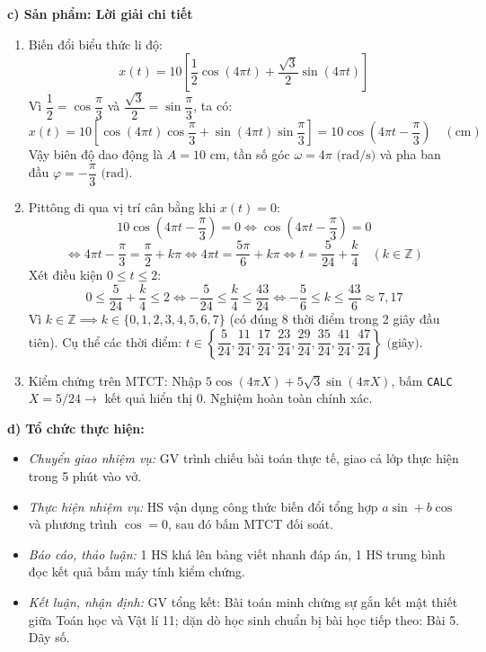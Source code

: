 \documentclass[12pt, a4paper]{article}
\begin{document}
\noindent \textbf{c) Sản phẩm: Lời giải chi tiết}  
\begin{enumerate}[leftmargin=0.6cm]  
    \item Biến đổi biểu thức li độ:  
    $$x(t) = 10 \left[ \dfrac{1}{2}\cos(4\pi t) + \dfrac{\sqrt{3}}{2}\sin(4\pi t) \right]$$  
    Vì $\dfrac{1}{2} = \cos\dfrac{\pi}{3}$ và $\dfrac{\sqrt{3}}{2} = \sin\dfrac{\pi}{3}$, ta có:  
    $$x(t) = 10 \left[ \cos(4\pi t)\cos\dfrac{\pi}{3} + \sin(4\pi t)\sin\dfrac{\pi}{3} \right] = 10\cos\left(4\pi t - \dfrac{\pi}{3}\right) \quad (\text{cm})$$  
    Vậy biên độ dao động là $A = 10\text{ cm}$, tần số góc $\omega = 4\pi\text{ (rad/s)}$ và pha ban đầu $\varphi = -\dfrac{\pi}{3}\text{ (rad)}$.  
    \item Pittông đi qua vị trí cân bằng khi $x(t) = 0$:  
    $$10\cos\left(4\pi t - \dfrac{\pi}{3}\right) = 0 \iff \cos\left(4\pi t - \dfrac{\pi}{3}\right) = 0$$  
    $$\iff 4\pi t - \dfrac{\pi}{3} = \dfrac{\pi}{2} + k\pi \iff 4\pi t = \dfrac{5\pi}{6} + k\pi \iff t = \dfrac{5}{24} + \dfrac{k}{4} \quad (k \in \mathbb{Z})$$  
    Xét điều kiện $0 \le t \le 2$:  
    $$0 \le \dfrac{5}{24} + \dfrac{k}{4} \le 2 \iff -\dfrac{5}{24} \le \dfrac{k}{4} \le \dfrac{43}{24} \iff -\dfrac{5}{6} \le k \le \dfrac{43}{6} \approx 7{,}17$$  
    Vì $k \in \mathbb{Z} \implies k \in \{0, 1, 2, 3, 4, 5, 6, 7\}$ (có đúng $8$ thời điểm trong 2 giây đầu tiên).  
    Cụ thể các thời điểm: $t \in \left\{\dfrac{5}{24}, \dfrac{11}{24}, \dfrac{17}{24}, \dfrac{23}{24}, \dfrac{29}{24}, \dfrac{35}{24}, \dfrac{41}{24}, \dfrac{47}{24}\right\}\text{ (giây)}$.  
    \item Kiểm chứng trên MTCT: Nhập $5\cos(4\pi X) + 5\sqrt{3}\sin(4\pi X)$, bấm \texttt{CALC} $X = 5/24 \to$ kết quả hiển thị $0$. Nghiệm hoàn toàn chính xác.  
\end{enumerate}  
  
\noindent \textbf{d) Tổ chức thực hiện:}  
\begin{itemize}[leftmargin=0.8cm]  
    \item \textit{Chuyển giao nhiệm vụ:} GV trình chiếu bài toán thực tế, giao cả lớp thực hiện trong 5 phút vào vở.  
    \item \textit{Thực hiện nhiệm vụ:} HS vận dụng công thức biến đổi tổng hợp $a\sin + b\cos$ và phương trình $\cos = 0$, sau đó bấm MTCT đối soát.  
    \item \textit{Báo cáo, thảo luận:} 1 HS khá lên bảng viết nhanh đáp án, 1 HS trung bình đọc kết quả bấm máy tính kiểm chứng.  
    \item \textit{Kết luận, nhận định:} GV tổng kết: Bài toán minh chứng sự gắn kết mật thiết giữa Toán học và Vật lí 11; dặn dò học sinh chuẩn bị bài học tiếp theo: Bài 5. Dãy số.  
\end{itemize}  
  
\end{document}
